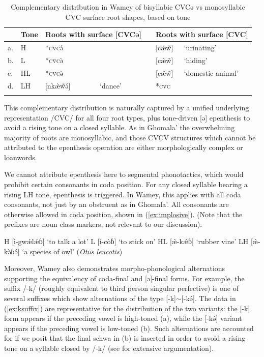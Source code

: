 \documentclass[output=paper,colorlinks,citecolor=brown,draft,draftmode]{langscibook}
\begin{document}
\begin{table}
\caption{Complementary distribution in Wamey of bisyllabic CVCə vs monosyllabic CVC surface root shapes, based on  tone \citep{santos1996}}
\label{tab:wamey}
 \begin{tabularx}{\textwidth}{lllXlll}
  \lsptoprule
&Tone&	\multicolumn{2}{l}{Roots with surface  [CVCə]}& &\multicolumn{2}{l}{Roots with surface  [CVC]} \\
 \midrule
a.&H&*\textsc{cv́c}ə́&&	& [cǽw̃] &	`urinating'\\
b.&L&*\textsc{cv̀c}ə̀&&	& [cæ̀w̃] &	`hiding'\\
c.&HL&*\textsc{cv́c}ə̀&&	& [cæ̂w̃] &	`domestic animal'\\
d.&LH&[nkæ̀w̃ə́]&	`dance'&& *\textsc{cv̌c}	&\\
\lspbottomrule
\end{tabularx}
\end{table}

This complementary distribution is naturally captured by a unified underlying representation /CVC/ for all four root types, plus tone-driven [ə] epenthesis to avoid a rising tone on a closed syllable.
As in Ghomala' the overwhelming majority of roots are monosyllabic, and those CVCV structures which cannot be attributed to the epenthesis operation are either morphologically complex or  loanwords.

We cannot attribute  epenthesis here to segmental phonotactics, which would prohibit certain consonants in coda position. 
For any closed syllable bearing  a rising LH tone, epenthesis is triggered. 
In Wamey, this applies with all coda consonants, not just by an obstruent as in Ghomala'.
All consonants are otherwise allowed in coda position, shown in  (\ref{ex:implosive}).
(Note that the prefixes are noun class markers, not relevant to our discussion).

\begin{exe}
	\ex \label{ex:implosive}
	    \begin{xlist}
        	\ex H   [ì-gwǽlǽɓ] ‘to talk a lot’	
        	\ex L  [ì-còɓ] ‘to stick on’
		    \ex HL    [æ̀-kæ̂ɓ] ‘rubber vine’
		    \ex LH  [æ̀-kə̀ɓə́] ‘a species  of owl’ (\textit{Otus leucotis})	
	    \end{xlist}
\end{exe}


\newpage
Moreover, Wamey also demonstrates morpho-phonological alternations supporting the equivalency of coda-final and [ə]-final forms.
For example, the suffix /-k/ (roughly equivalent to third person singular perfective) is one of several suffixes which show alternations of the type [-k]$\sim$[-kə́].
The data in (\ref{ex:ksuffix}) are representative for the distribution of the two variants: the [-k] form appears if the preceding vowel is high-toned (a),
while the [-kə́]
variant appears if the preceding vowel is low-toned (b).
Such alternations are accounted for if we posit that the final schwa in (b) is inserted in order to avoid a rising tone on a syllable closed by /-k/ (see \citealt{rollemerrill2022} for extensive argumentation).
\end{document}
